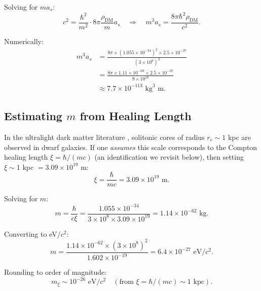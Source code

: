 \documentclass[11pt,a4paper]{article}
\theoremstyle{definition}
\theoremstyle{remark}
\begin{document}
Solving for $m a_s$:
\begin{equation}
c^2 = \frac{\hbar^2}{m^2} \cdot 8\pi \frac{\rho_{\mathrm{DM}}}{m} a_s \quad \Rightarrow \quad m^3 a_s = \frac{8\pi\hbar^2 \rho_{\mathrm{DM}}}{c^2}.
\end{equation}

Numerically:
\begin{align}
m^3 a_s &= \frac{8\pi \times (1.055 \times 10^{-34})^2 \times 2.5 \times 10^{-27}}{(3 \times 10^8)^2} \nonumber \\
&= \frac{8\pi \times 1.11 \times 10^{-68} \times 2.5 \times 10^{-27}}{9 \times 10^{16}} \nonumber \\
&\approx 7.7 \times 10^{-113} \text{ kg}^3 \text{ m}.
\end{align}

\subsection{Estimating $m$ from Healing Length}
\label{sec:estimate_m}

In the ultralight dark matter literature \cite{Hu2000,Schive2014}, solitonic cores of radius $r_c \sim 1$ kpc are observed in dwarf galaxies. If one \emph{assumes} this scale corresponds to the Compton healing length $\xi = \hbar/(mc)$ (an identification we revisit below), then setting $\xi \sim 1$ kpc $= 3.09 \times 10^{19}$ m:
\begin{equation}
\xi = \frac{\hbar}{mc} = 3.09 \times 10^{19} \text{ m}.
\end{equation}

Solving for $m$:
\begin{equation}
m = \frac{\hbar}{c\xi} = \frac{1.055 \times 10^{-34}}{3 \times 10^8 \times 3.09 \times 10^{19}} = 1.14 \times 10^{-62} \text{ kg}.
\end{equation}

Converting to eV/$c^2$:
\begin{equation}
m = \frac{1.14 \times 10^{-62} \times (3 \times 10^8)^2}{1.602 \times 10^{-19}} = 6.4 \times 10^{-27} \text{ eV}/c^2.
\end{equation}

Rounding to order of magnitude:
\begin{equation}
\boxed{m_{\xi} \sim 10^{-26} \text{ eV}/c^2 \quad (\text{from } \xi = \hbar/(mc) \sim 1 \text{ kpc}).}
\end{equation}
\end{document}
